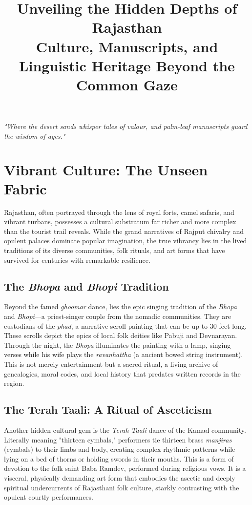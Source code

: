 \documentclass[12pt]{article}
\title{\vspace{-2cm}\textbf{Unveiling the Hidden Depths of Rajasthan}\\
\large{Culture, Manuscripts, and Linguistic Heritage Beyond the Common Gaze}}
\author{}
\date{}
\begin{document}
\maketitle
\vspace{-1cm}
\begin{center}
\textit{"Where the desert sands whisper tales of valour, and palm-leaf manuscripts guard the wisdom of ages."}
\end{center}
\vspace{0.5cm}

\tableofcontents
\newpage

\section{Vibrant Culture: The Unseen Fabric}
Rajasthan, often portrayed through the lens of royal forts, camel safaris, and vibrant turbans, possesses a cultural substratum far richer and more complex than the tourist trail reveals. While the grand narratives of Rajput chivalry and opulent palaces dominate popular imagination, the true vibrancy lies in the lived traditions of its diverse communities, folk rituals, and art forms that have survived for centuries with remarkable resilience.

\subsection{The \textit{Bhopa} and \textit{Bhopi} Tradition}
Beyond the famed \textit{ghoomar} dance, lies the epic singing tradition of the \textit{Bhopa} and \textit{Bhopi}—a priest-singer couple from the nomadic communities. They are custodians of the \textit{phad}, a narrative scroll painting that can be up to 30 feet long. These scrolls depict the epics of local folk deities like Pabuji and Devnarayan. Through the night, the \textit{Bhopa} illuminates the painting with a lamp, singing verses while his wife plays the \textit{ravanhattha} (a ancient bowed string instrument). This is not merely entertainment but a sacred ritual, a living archive of genealogies, moral codes, and local history that predates written records in the region.

\subsection{The Terah Taali: A Ritual of Asceticism}
Another hidden cultural gem is the \textit{Terah Taali} dance of the Kamad community. Literally meaning "thirteen cymbals," performers tie thirteen brass \textit{manjiras} (cymbals) to their limbs and body, creating complex rhythmic patterns while lying on a bed of thorns or holding swords in their mouths. This is a form of devotion to the folk saint Baba Ramdev, performed during religious vows. It is a visceral, physically demanding art form that embodies the ascetic and deeply spiritual undercurrents of Rajasthani folk culture, starkly contrasting with the opulent courtly performances.
\end{document}
